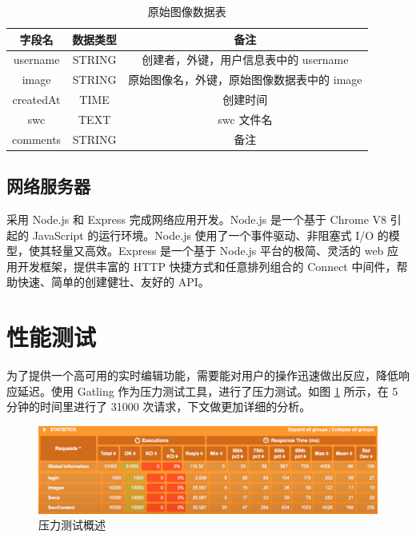 \begin{table}
\centering
\caption{原始图像数据表}
\begin{tabular}{|c|c|c|}
			   \hline
                 字段名 & 数据类型 & 备注 \\
               \hline
                 username & STRING & 创建者，外键，用户信息表中的 username \\
               \hline
                 image & STRING & 原始图像名，外键，原始图像数据表中的 image \\
               \hline
                 createdAt & TIME & 创建时间 \\
               \hline
                 swc & TEXT & swc 文件名 \\
               \hline
                 comments & STRING & 备注 \\
               \hline
             \end{tabular}
             \label{swc-table}    
\end{table}

\subsection{网络服务器}
采用 Node.js 和 Express 完成网络应用开发。Node.js 是一个基于 Chrome V8 引起的 JavaScript 的运行环境。Node.js 使用了一个事件驱动、非阻塞式 I/O 的模型，使其轻量又高效。Express 是一个基于 Node.js 平台的极简、灵活的 web 应用开发框架，提供丰富的 HTTP 快捷方式和任意排列组合的 Connect 中间件，帮助快速、简单的创建健壮、友好的 API。


\section{性能测试}
为了提供一个高可用的实时编辑功能，需要能对用户的操作迅速做出反应，降低响应延迟。使用 Gatling 作为压力测试工具，进行了压力测试。如图 \ref{overview} 所示，在 5 分钟的时间里进行了 31000 次请求，下文做更加详细的分析。
\begin{figure}
\centering
\includegraphics[width=148mm]{images/overview}
\caption{压力测试概述}
\label{overview}
\end{figure}

